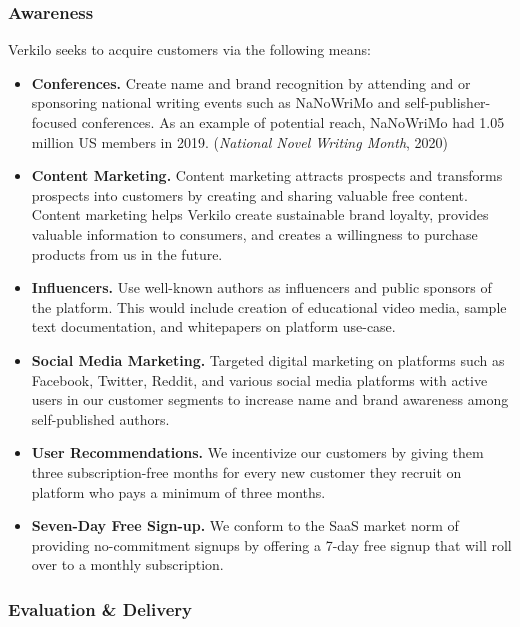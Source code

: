 \documentclass[10pt,openany]{book}
\providecommand{\tightlist}{%
  \setlength{\itemsep}{0pt}\setlength{\parskip}{0pt}}
\begin{document}
\hypertarget{awareness}{%
\subsubsection{Awareness}\label{awareness}}

Verkilo seeks to acquire customers via the following means:

\begin{itemize}
\tightlist
\item
  \textbf{Conferences.} Create name and brand recognition by attending
  and or sponsoring national writing events such as NaNoWriMo and
  self-publisher-focused conferences. As an example of potential reach,
  NaNoWriMo had 1.05 million US members in 2019. (\emph{National Novel
  Writing Month}, 2020)
\item
  \textbf{Content Marketing.} Content marketing attracts prospects and
  transforms prospects into customers by creating and sharing valuable
  free content. Content marketing helps Verkilo create sustainable brand
  loyalty, provides valuable information to consumers, and creates a
  willingness to purchase products from us in the future.
\item
  \textbf{Influencers.} Use well-known authors as influencers and public
  sponsors of the platform. This would include creation of educational
  video media, sample text documentation, and whitepapers on platform
  use-case.
\item
  \textbf{Social Media Marketing.} Targeted digital marketing on
  platforms such as Facebook, Twitter, Reddit, and various social media
  platforms with active users in our customer segments to increase name
  and brand awareness among self-published authors.
\item
  \textbf{User Recommendations.} We incentivize our customers by giving
  them three subscription-free months for every new customer they
  recruit on platform who pays a minimum of three months.
\item
  \textbf{Seven-Day Free Sign-up.} We conform to the SaaS market norm of
  providing no-commitment signups by offering a 7-day free signup that
  will roll over to a monthly subscription.
\end{itemize}

\hypertarget{evaluation-delivery}{%
\subsubsection{Evaluation \& Delivery}\label{evaluation-delivery}}
\end{document}
